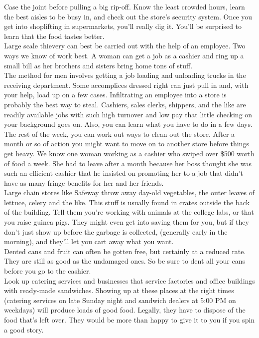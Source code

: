 \documentclass[11pt,twoside,a4paper]{book}
\begin{document}
Case the joint before pulling a big rip-off. Know the least crowded hours, learn the best aisles to be busy in, and check out the store's security system. Once you get into shoplifting in supermarkets, you'll really dig it. You'll be surprised to learn that the food tastes better.~\\

Large scale thievery can best be carried out with the help of an employee. Two ways we know of work best. A woman can get a job as a cashier and ring up a small bill as her brothers and sisters bring home tons of stuff.~\\

The method for men involves getting a job loading and unloading trucks in the receiving department. Some accomplices dressed right can just pull in and, with your help, load up on a few cases. Infiltrating an employee into a store is probably the best way to steal. Cashiers, sales clerks, shippers, and the like are readily available jobs with such high turnover and low pay that little checking on your background goes on. Also, you can learn what you have to do in a few days. The rest of the week, you can work out ways to clean out the store. After a month or so of action you might want to move on to another store before things get heavy. We know one woman working as a cashier who swiped over \$500 worth of food a week. She had to leave after a month because her boss thought she was such an efficient cashier that he insisted on promoting her to a job that didn't have as many fringe benefits for her and her friends.~\\

Large chain stores like Safeway throw away day-old vegetables, the outer leaves of lettuce, celery and the like. This stuff is usually found in crates outside the back of the building. Tell them you're working with animals at the college labs, or that you raise guinea pigs. They might even get into saving them for you, but if they don't just show up before the garbage is collected, (generally early in the morning), and they'll let you cart away what you want.~\\

Dented cans and fruit can often be gotten free, but certainly at a reduced rate. They are still as good as the undamaged ones. So be sure to dent all your cans before you go to the cashier.~\\

Look up catering services and businesses that service factories and office buildings with ready-made sandwiches. Showing up at these places at the right times (catering services on late Sunday night and sandwich dealers at 5:00 PM on weekdays) will produce loads of good food. Legally, they have to dispose of the food that's left over. They would be more than happy to give it to you if you spin a good story.~\\
\end{document}
